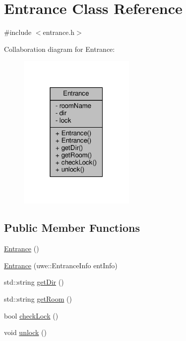 \hypertarget{class_entrance}{}\section{Entrance Class Reference}
\label{class_entrance}


{\ttfamily \#include $<$entrance.\+h$>$}



Collaboration diagram for Entrance\+:
\nopagebreak
\begin{figure}[H]
\begin{center}
\leavevmode
\includegraphics[width=159pt]{class_entrance__coll__graph}
\end{center}
\end{figure}
\subsection*{Public Member Functions}
\begin{DoxyCompactItemize}
\item 
\hyperlink{class_entrance_a88cd27875093371afa47ac0f321716d7}{Entrance} ()
\item 
\hyperlink{class_entrance_a84a2ab9846eb0271b98e22bc131e1ca2}{Entrance} (uwe\+::\+Entrance\+Info ent\+Info)
\item 
std\+::string \hyperlink{class_entrance_a52a2c624cd71effe98fb65b688089dba}{get\+Dir} ()
\item 
std\+::string \hyperlink{class_entrance_abddd96900248aace4478339cfc0b08cb}{get\+Room} ()
\item 
bool \hyperlink{class_entrance_a4bbdb80d7ee6f5fbe3619e9177901d38}{check\+Lock} ()
\item 
void \hyperlink{class_entrance_af14ff07579df1b040890c3a2e447898c}{unlock} ()
\end{DoxyCompactItemize}
